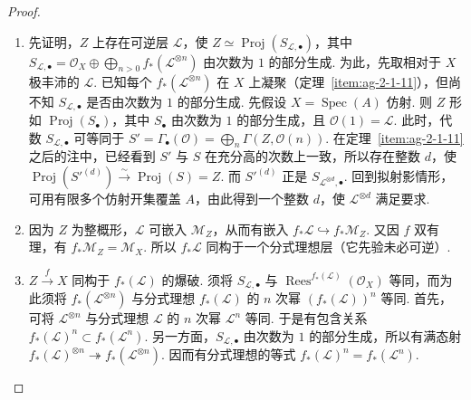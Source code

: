 \begin{proof}
\begin{enumerate}[label=\arabic*-]
\item 先证明，$Z$ 上存在可逆层 $\mathcal L$，使 $Z\simeq\operatorname{Proj}(S_{\mathcal L,\bullet})$，其中 $S_{\mathcal L,\bullet}=\mathcal O_X\oplus\bigoplus_{n>0}f_*(\mathcal L^{\otimes n})$ 由次数为 $1$ 的部分生成.
为此，先取相对于 $X$ 极丰沛的 $\mathcal L$. 已知每个 $f_*(\mathcal L^{\otimes n})$ 在 $X$ 上凝聚（定理~\ref{item:ag-2-1-11}），但尚不知 $S_{\mathcal L,\bullet}$ 是否由次数为 $1$ 的部分生成. 先假设 $X=\operatorname{Spec}(A)$ 仿射. 则 $Z$ 形如 $\operatorname{Proj}(S_\bullet)$，其中 $S_\bullet$ 由次数为 $1$ 的部分生成，且 $\mathcal O(1)=\mathcal L$. 此时，代数 $S_{\mathcal L,\bullet}$ 可等同于 $S'=\Gamma_\bullet(\mathcal O)=\bigoplus_n\Gamma(Z,\mathcal O(n))$. 在定理~\ref{item:ag-2-1-11}之后的注中，已经看到 $S'$ 与 $S$ 在充分高的次数上一致，所以存在整数 $d$，使 $\operatorname{Proj}(S'^{(d)})\xrightarrow\sim\operatorname{Proj}(S)=Z$. 而 $S'^{(d)}$ 正是 $S_{\mathcal L^{\otimes d},\bullet}$. 回到拟射影情形，可用有限多个仿射开集覆盖 $A$，由此得到一个整数 $d$，使 $\mathcal L^{\otimes d}$ 满足要求.
\item 因为 $Z$ 为整概形，$\mathcal L$ 可嵌入 $\mathcal M_Z$，从而有嵌入 $f_*\mathcal L\hookrightarrow f_*\mathcal M_Z$. 又因 $f$ 双有理，有 $f_*\mathcal M_Z=\mathcal M_X$. 所以 $f_*\mathcal L$ 同构于一个分式理想层（它先验未必可逆）.
\item $Z\xrightarrow f X$ 同构于 $f_*(\mathcal L)$ 的爆破.
须将 $S_{\mathcal L,\bullet}$ 与 $\operatorname{Rees}^{f_*(\mathcal L)}(\mathcal O_X)$ 等同，而为此须将 $f_*(\mathcal L^{\otimes n})$ 与分式理想 $f_*(\mathcal L)$ 的 $n$ 次幂 $(f_*(\mathcal L))^n$ 等同. 首先，可将 $\mathcal L^{\otimes n}$ 与分式理想 $\mathcal L$ 的 $n$ 次幂 $\mathcal L^n$ 等同. 于是有包含关系 $f_*(\mathcal L)^n\subset f_*(\mathcal L^n)$. 另一方面，$S_{\mathcal L,\bullet}$ 由次数为 $1$ 的部分生成，所以有满态射 $f_*(\mathcal L)^{\otimes n}\twoheadrightarrow f_*(\mathcal L^{\otimes n})$. 因而有分式理想的等式 $f_*(\mathcal L)^n=f_*(\mathcal L^n)$.\qedhere
\end{enumerate}
\end{proof}
